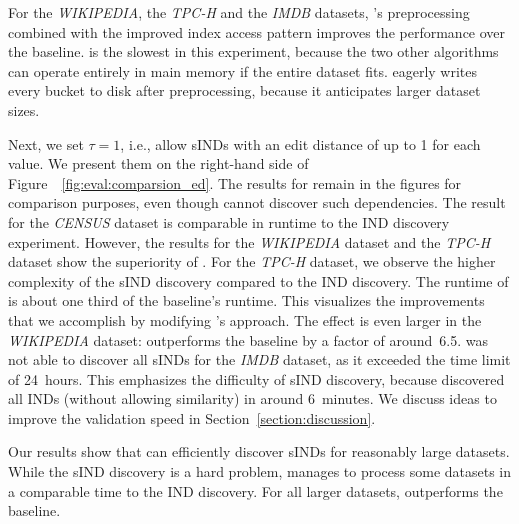 For the \emph{WIKIPEDIA}, the \emph{TPC-H} and the \emph{IMDB} datasets, \sawfish's preprocessing combined with the improved index access pattern improves the performance over the baseline.
 is the slowest in this experiment, because the two other algorithms can operate entirely in main memory if the entire dataset fits.
 eagerly writes every bucket to disk after preprocessing, because it anticipates larger dataset sizes. %

Next, we set $\tau=1$, i.e., allow sINDs with an edit distance of up to 1 for each value.
We present them on the right-hand side of Figure~~\ref{fig:eval:comparsion_ed}.
The results for  remain in the figures for comparison purposes, even though  cannot discover such dependencies.
The result for the \emph{CENSUS} dataset is comparable in runtime to the IND discovery experiment.
However, the results for the \emph{WIKIPEDIA} dataset and the \emph{TPC-H} dataset show the superiority of \sawfish.
For the \emph{TPC-H} dataset, we observe the higher complexity of the sIND discovery compared to the IND discovery.
The runtime of \sawfish is about one third of the baseline's runtime.
This visualizes the improvements that we accomplish by modifying 's approach.
The effect is even larger in the \emph{WIKIPEDIA} dataset:
\sawfish outperforms the baseline by a factor of around~6.5. 
\sawfish was not able to discover all sINDs for the \emph{IMDB} dataset, as it exceeded the time limit of 24~hours.
This emphasizes the difficulty of sIND discovery, because \sawfish discovered all INDs (without allowing similarity) in around 6~minutes.
We discuss ideas to improve the validation speed in Section~\ref{section:discussion}.

Our results show that \sawfish can efficiently discover sINDs for reasonably large datasets.
While the sIND discovery is a hard problem, \sawfish manages to process some datasets in a comparable time to the IND discovery.
For all larger datasets, \sawfish outperforms the baseline.

